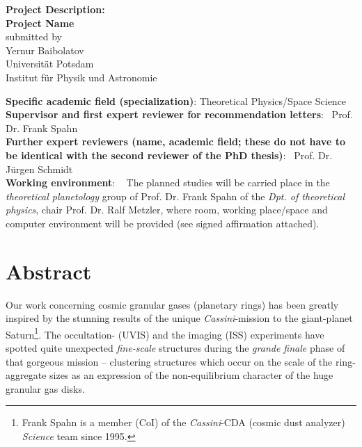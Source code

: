 \documentclass[11pt, notitlepage]{article} %
\begin{document}

\begin{center}
{\Large \textbf{Project Description:}}\\  
\vspace{.5cm}
{\LARGE\textbf{Project Name}} 
\\[.75cm] 
submitted by\\
{Yernur Baibolatov\\
Universit\"at Potsdam\\
Institut f\"ur Physik und Astronomie}
\end{center}
\noindent\textbf{Specific academic field (specialization)}:  Theoretical Physics/Space Science
\\[.75cm] 
\textbf{Supervisor and first expert reviewer for recommendation letters}: \,  Prof. Dr. Frank Spahn
\\[.75cm] 
\textbf{Further expert reviewers (name, academic field; these do not have to be identical with the second reviewer of the PhD thesis)}: \, Prof. Dr. J\"urgen Schmidt \,
\\[.75cm] 
\textbf{Working environment}: ~ The planned studies  will be carried place in the \emph{theoretical planetology} group of Prof. Dr. Frank Spahn of the  \emph{Dpt. 
of theoretical physics}, chair Prof. Dr. Ralf Metzler, where room, working place/space and computer environment will be provided (see signed affirmation attached).

\newpage
\section*{Abstract}

Our work concerning cosmic granular gases (planetary rings) has been greatly inspired by the stunning results of the unique  
\emph{Cassini}-mission to the giant-planet Saturn\footnote{Frank Spahn is a member (CoI) of the \emph{Cassini}-CDA (cosmic dust analyzer)
\emph{Science} team since 1995.}. The occultation- (UVIS) and the imaging (ISS) experiments have spotted quite unexpected \emph{fine-scale} structures
during the \emph{grande finale} phase of that gorgeous mission -- clustering structures which occur on the scale of the ring-aggregate sizes as an expression 
of the non-equilibrium character of the huge granular gas disks.\\
\end{document}
